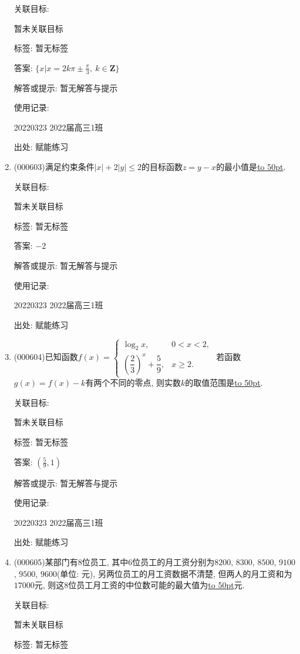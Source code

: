 \documentclass[10pt,a4paper]{article}
\newcommand{\blank}[1]{\underline{\hbox to #1pt{}}}
\begin{document}
\begin{enumerate}[1.]
关联目标:

暂未关联目标



标签: 暂无标签

答案: $\{ x|x=2k\pi \pm \frac{\pi }3,\ k\in \mathbf{Z}\}$

解答或提示: 暂无解答与提示

使用记录:

20220323	2022届高三1班	


出处: 赋能练习
\item { (000603)}满足约束条件$|x|+2|y|\le 2$的目标函数$z=y-x$的最小值是\blank{50}.


关联目标:

暂未关联目标



标签: 暂无标签

答案: $-2$

解答或提示: 暂无解答与提示

使用记录:

20220323	2022届高三1班	


出处: 赋能练习
\item { (000604)}已知函数$f(x)=\begin{cases} \log_2 x, & 0<x<2, \\ (\dfrac23)^x+\dfrac59, & x\ge 2. \end{cases}$ 若函数$g(x)=f(x)-k$有两个不同的零点, 则实数$k$的取值范围是\blank{50}.


关联目标:

暂未关联目标



标签: 暂无标签

答案: $(\frac 59,1)$

解答或提示: 暂无解答与提示

使用记录:

20220323	2022届高三1班	


出处: 赋能练习
\item { (000605)}某部门有$8$位员工, 其中$6$位员工的月工资分别为$8200$, $8300$, $8500$, $9100$, $9500$, $9600$(单位: 元), 另两位员工的月工资数据不清楚, 但两人的月工资和为$17000$元, 则这$8$位员工月工资的中位数可能的最大值为\blank{50}元.


关联目标:

暂未关联目标



标签: 暂无标签


\end{enumerate}
\end{document}
